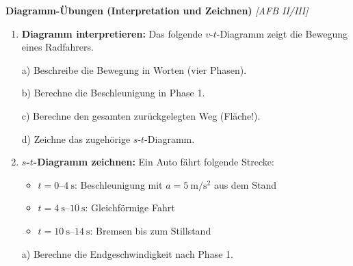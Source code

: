 \documentclass[11pt, a4paper]{article}
\begin{document}
\vspace{1em}

\textbf{Diagramm-Übungen (Interpretation und Zeichnen)} \hfill \textit{[AFB II/III]}

\begin{enumerate}[resume]
    \item \textbf{Diagramm interpretieren:} Das folgende $v$-$t$-Diagramm zeigt die Bewegung eines Radfahrers.

\begin{center}
\end{center}

    a) Beschreibe die Bewegung in Worten (vier Phasen).

    b) Berechne die Beschleunigung in Phase 1.

    c) Berechne den gesamten zurückgelegten Weg (Fläche!).

    d) Zeichne das zugehörige $s$-$t$-Diagramm.

    \item \textbf{$s$-$t$-Diagramm zeichnen:} Ein Auto fährt folgende Strecke:
    \begin{itemize}[leftmargin=1.5em]
        \item $t = 0$--$\SI{4}{\second}$: Beschleunigung mit $a = \SI{5}{\metre\per\second\squared}$ aus dem Stand
        \item $t = \SI{4}{\second}$--$\SI{10}{\second}$: Gleichförmige Fahrt
        \item $t = \SI{10}{\second}$--$\SI{14}{\second}$: Bremsen bis zum Stillstand
    \end{itemize}

    a) Berechne die Endgeschwindigkeit nach Phase 1.


\end{enumerate}
\end{document}
